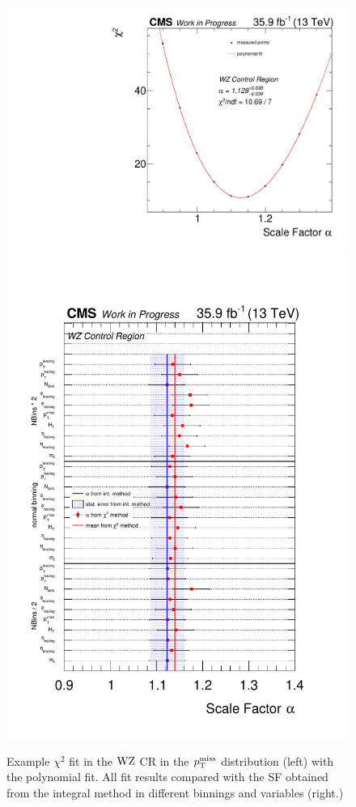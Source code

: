 \begin{figure}[tbp]
 \centering
 \includegraphics[width=\pairwidth]{figures/plots_CR/chi/WZ_met}
 \includegraphics[width=\pairwidth]{figures/plots_CR/chi/WZ_Compare}
 \caption{Example $\chi^2$ fit in the $\mathrm{W}\mathrm{Z}$ CR in the $p_{\mathrm{T}}^\text{miss}$ distribution (left) with the polynomial fit. All fit results compared with the SF obtained from the integral method in different binnings and variables (right.)}
 \label{fig:chiWZ}
\end{figure}


